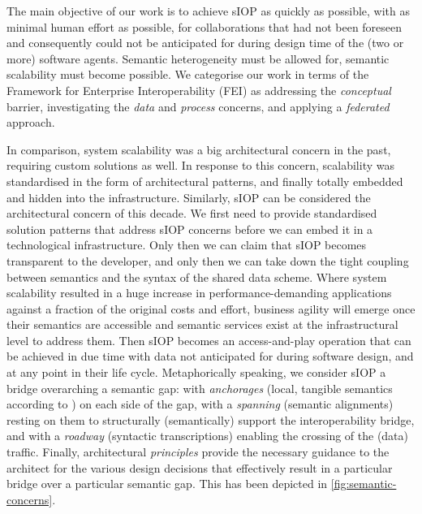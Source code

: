 \documentclass[sort&compress,preprint,authoryear,3p,twocolumn]{elsarticle}
\begin{document}
The main objective of our work is to achieve sIOP as quickly as
possible, with as minimal human effort as possible, for collaborations
that had not been foreseen and consequently could not be anticipated for
during design time of the (two or more) software agents. Semantic
heterogeneity must be allowed for, semantic scalability must become
possible. We categorise our work in terms of the Framework for
Enterprise Interoperability (FEI) \citep{Chen2017} as addressing the
\emph{conceptual} barrier, investigating the \emph{data} and
\emph{process} concerns, and applying a \emph{federated} approach.

In comparison, system scalability was a big architectural concern in the
past, requiring custom solutions as well. In response to this concern,
scalability was standardised in the form of architectural patterns, and
finally totally embedded and hidden into the infrastructure. Similarly,
sIOP can be considered the architectural concern of this decade. We
first need to provide standardised solution patterns that address sIOP
concerns before we can embed it in a technological infrastructure. Only
then we can claim that sIOP becomes transparent to the developer, and
only then we can take down the tight coupling between semantics and the
syntax of the shared data scheme. Where system scalability resulted in a
huge increase in performance-demanding applications against a fraction
of the original costs and effort, business agility will emerge once
their semantics are accessible and semantic services exist at the
infrastructural level to address them. Then sIOP becomes an
access-and-play operation that can be achieved in due time with data not
anticipated for during software design, and at any point in their life
cycle. Metaphorically speaking, we consider sIOP a bridge overarching a
semantic gap: with \emph{anchorages} (local, tangible semantics
according to \citep{Brandt2021a}) on each side of the gap, with a
\emph{spanning} (semantic alignments) resting on them to structurally
(semantically) support the interoperability bridge, and with a
\emph{roadway} (syntactic transcriptions) enabling the crossing of the
(data) traffic. Finally, architectural \emph{principles} provide the
necessary guidance to the architect for the various design decisions
that effectively result in a particular bridge over a particular
semantic gap. This has been depicted in \cref{fig:semantic-concerns}.
\end{document}
